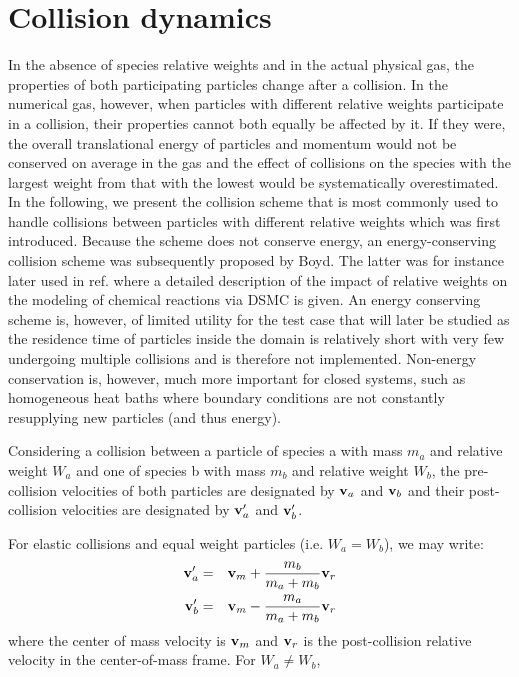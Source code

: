 \documentclass[12pt]{article}
\newcommand{\bv}{{\bf v}}
\newcommand{\va}{\bv_a}
\newcommand{\vb}{\bv_b}
\newcommand{\vap}{\va^\prime}
\newcommand{\vbp}{\vb^\prime}
\begin{document}
\section{Collision dynamics}

In the absence of species relative weights and in the actual physical
gas, the properties of both participating particles change after a
collision. In the numerical gas, however, when particles with
different relative weights participate in a collision, their
properties cannot both equally be affected by it. If they were, the
overall translational energy of particles and momentum would not be
conserved on average in the gas and the effect of collisions on the
species with the largest weight from that with the lowest would be
systematically overestimated. In the following, we present the
collision scheme that is most commonly used to handle collisions
between particles with different relative weights which was first
introduced. Because the scheme does not conserve energy, an
energy-conserving collision scheme was subsequently proposed by
Boyd. The latter was for instance later used in ref. where a detailed
description of the impact of relative weights on the modeling of
chemical reactions via DSMC is given. An energy conserving scheme is,
however, of limited utility for the test case that will later be
studied as the residence time of particles inside the domain is
relatively short with very few undergoing multiple collisions and is
therefore not implemented.  Non-energy conservation is, however, much
more important for closed systems, such as homogeneous heat baths
where boundary conditions are not constantly resupplying new particles
(and thus energy).

Considering a collision between a particle of species a with mass
$m_a$ and relative weight $W_a$ and one of species b with mass $m_b$
and relative weight $W_b$, the pre-collision velocities of both
particles are designated by $\va$ and $\vb$ and their post-collision
velocities are designated by $\vap$ and $\vbp$. 

For elastic collisions and equal weight particles (i.e. $W_a=W_b$), we
may write:
\begin{eqnarray}
  \vap &=& \bv_m + \frac{m_b}{m_a+m_b}\bv_r \\
  \vbp &=& \bv_m - \frac{m_a}{m_a+m_b}\bv_r
\end{eqnarray}
where the center of mass velocity is $\bv_m$ and $\bv_r$ is the
post-collision relative velocity in the center-of-mass frame.  For
$W_a\not=W_b$, 
\end{document}
